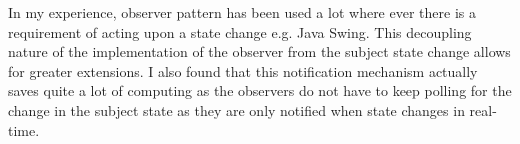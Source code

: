 In my experience, observer pattern has been used a lot where ever there is a requirement of acting upon a state change e.g. Java Swing. This decoupling nature of the implementation of the observer from the subject state change allows for greater extensions. I also found that this notification mechanism actually saves quite a lot of computing as the observers do not have to keep polling for the change in the subject state as they are only notified when state changes in real-time. 
